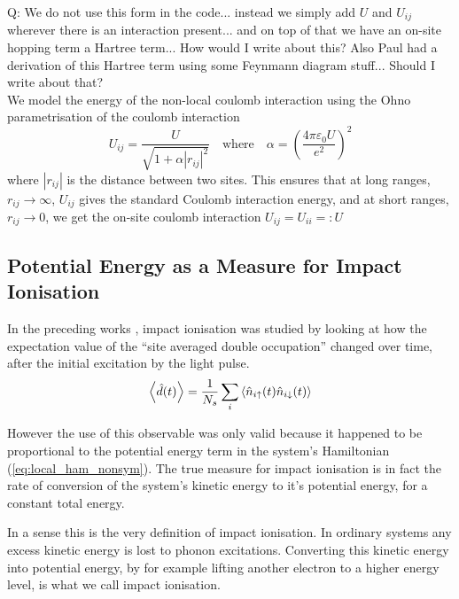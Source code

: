 {\color{red} Q: We do not use this form in the code... instead we simply add $U$ and $U_{ij}$ wherever there is an interaction present... and on top of that we have an on-site hopping term a Hartree term... How would I write about this? Also Paul had a derivation of this Hartree term using some Feynmann diagram stuff... Should I write about that?}
\\

We model the energy of the non-local coulomb interaction using the Ohno parametrisation of the coulomb interaction  \cite{ppp_ohno, hoerbinger}
\begin{equation}
    U_{ij} = \frac{U}{\sqrt{1 + \alpha |r_{ij}|^2}} \quad \text{where} \quad \alpha = \left(\frac{4\pi\varepsilon_0 U}{e^2} \right)^2 \label{eq:ohno_interpolation}
\end{equation}
where $|r_{ij}|$ is the distance between two sites. This ensures that at long ranges, $r_{ij}\to\infty$, $U_{ij}$ gives the standard Coulomb interaction energy, and at short ranges, $r_{ij}\to 0$, we get the on-site coulomb interaction $U_{ij} = U_{ii} =: U$ 

\subsection{Potential Energy as a Measure for Impact Ionisation}
In the preceding works \cite{innerberger,worm_bachelor,worm_project,prauhart}, impact ionisation was studied by looking at how the expectation value of the ``site averaged double occupation'' changed over time, after the initial excitation by the light pulse.
\begin{equation}
    \left\langle{\hat{d}(t)}\right\rangle = \frac{1}{N_s}\sum_i \braket{\hat{n}_{i\uparrow}(t)\hat{n}_{i\downarrow}(t)}
\end{equation}

However the use of this observable was only valid because it happened to be proportional to the potential energy term in the system's Hamiltonian (\ref{eq:local_ham_nonsym}). The true measure for impact ionisation is in fact the rate of conversion of the system's kinetic energy to it's potential energy, for a constant total energy.

\medskip
In a sense this is the very definition of impact ionisation. In ordinary systems any excess kinetic energy is lost to phonon excitations. Converting this kinetic energy into potential energy, by for example lifting another electron to a higher energy level, is what we call impact ionisation.
\medskip

